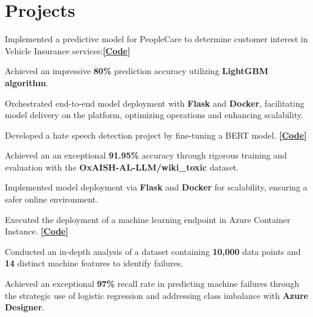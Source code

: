 \documentclass[]{deedy-resume-openfont}
\begin{document}
\begin{minipage}[t]{0.66\textwidth}
\section{Projects}
\item Implemented a predictive model for PeopleCare to determine customer interest in Vehicle Insurance services:\textbf{[\href{https://github.com/Shyam-Sundar-7/PeopleCare}{Code}]}
\begin{tightemize}
\item Achieved an impressive \textbf{80\%} prediction accuracy  utilizing \textbf{LightGBM 
        algorithm}.
\item Orchestrated end-to-end model deployment with  \textbf{Flask} and \textbf{Docker}, facilitating model delivery on the   platform, optimizing operations and enhancing scalability.
\end{tightemize}
\sectionsep

\item Developed a hate speech detection project by fine-tuning a BERT model. \textbf{[\href{https://github.com/Shyam-Sundar-7/Hate-Speech-recognition}{Code}]}
\begin{tightemize}
        \item Achieved an an exceptional \textbf{91.95\%} accuracy through rigorous training and evaluation with the \textbf{OxAISH-AL-LLM/wiki\_toxic} dataset.
        \item Implemented model deployment via \textbf{Flask} and \textbf{Docker} for scalability, ensuring a safer online environment.
\end{tightemize}
\sectionsep


\item Executed the deployment of a machine learning endpoint in Azure Container Instance. \textbf{[\href{https://github.com/Shyam-Sundar-7/Machine-Failure-Prediction}{Code}]}

\begin{tightemize}
        \item Conducted an in-depth analysis of a dataset containing \textbf{10,000} data points and \textbf{14} distinct machine features to identify failures.
        \item Achieved an exceptional \textbf{{97\%}} recall rate in predicting machine failures through the strategic use of logistic regression and addressing class imbalance with \textbf{Azure Designer}.
\end{tightemize}
\sectionsep


\end{minipage}
\end{document}
